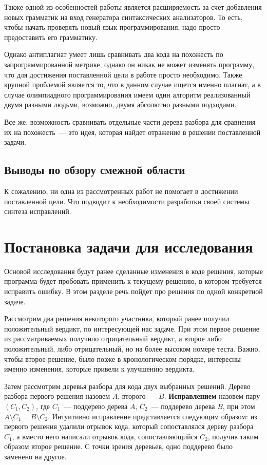 Также одной из особенностей работы является расширяемость за счет добавления новых грамматик на вход 
генератора синтаксических анализаторов. То есть, чтобы начать проверять новый язык программирования, надо
просто предоставить его грамматику.

Однако антиплагиат умеет лишь сравнивать два кода на похожесть по запрограммированной метрике, однако
он никак не может изменять программу, что для достижения поставленной цели в работе просто необходимо.
Также крупной проблемой является то, что в данном случае ищется именно плагиат, а в случае олимпиадного программирования
имеем один алгоритм реализованный двумя разными людьми, возможно, двумя абсолютно разными подходами.

Все же, возможность сравнивать отдельные части дерева разбора для сравнения их на похожесть~--- это идея,
которая найдет отражение в решении поставленной задачи.                                                                                                       

\subsection{Выводы по обзору смежной области}
К сожалению, ни одна из рассмотренных работ не помогает в достижении поставленной цели.
Что подводит к необходимости разработки своей системы синтеза
исправлений.


\section{Постановка задачи для исследования}
Основой исследования будут ранее сделанные изменения в коде решения, которые программа будет пробовать применить к текущему решению,
в котором требуется исправить ошибку. В этом разделе речь пойдет про решения по одной конкретной задаче.

Рассмотрим два решения некоторого участника, который ранее получил положительный вердикт, по интересующей нас задаче.
При этом первое решение из рассматриваемых получило отрицательный вердикт, а второе либо положительный, либо отрицательный, но
на более высоком номере теста. Важно, чтобы второе решение, было позже в хронологическом порядке, интересны именно изменения, которые
привели к улучшению вердикта.

Затем рассмотрим деревья разбора для кода двух выбранных решений. Дерево разбора первого решения назовем $A$, второго~--- $B$.
\textbf{Исправлением} назовем пару $(C_1, C_2)$, где $C_1$~--- поддерево дерева $A$, $C_2$~--- поддерево дерева $B$,
при этом $A \setminus C_1 = B \setminus C_2$. Интуитивно исправление представляется следующим образом: из первого решения
удалили отрывок кода, который сопоставлялся дереву разбора $C_1$, а вместо него написали отрывок кода, сопоставляющийся $C_2$,
получив таким  образом второе решение. С точки зрения деревьев, одно поддерево было заменено на другое.

